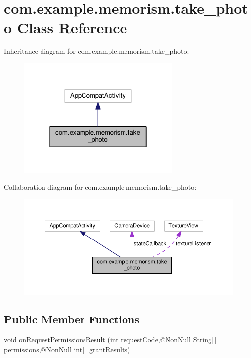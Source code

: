 \hypertarget{classcom_1_1example_1_1memorism_1_1take__photo}{}\section{com.\+example.\+memorism.\+take\+\_\+photo Class Reference}
\label{classcom_1_1example_1_1memorism_1_1take__photo}


Inheritance diagram for com.\+example.\+memorism.\+take\+\_\+photo\+:
\nopagebreak
\begin{figure}[H]
\begin{center}
\leavevmode
\includegraphics[width=226pt]{d9/d92/classcom_1_1example_1_1memorism_1_1take__photo__inherit__graph}
\end{center}
\end{figure}


Collaboration diagram for com.\+example.\+memorism.\+take\+\_\+photo\+:
\nopagebreak
\begin{figure}[H]
\begin{center}
\leavevmode
\includegraphics[width=350pt]{dd/d80/classcom_1_1example_1_1memorism_1_1take__photo__coll__graph}
\end{center}
\end{figure}
\subsection*{Public Member Functions}
\begin{DoxyCompactItemize}
\item 
void \hyperlink{classcom_1_1example_1_1memorism_1_1take__photo_a01baf490997362acf99a51951aa61d72}{on\+Request\+Permissions\+Result} (int request\+Code,@Non\+Null String\mbox{[}$\,$\mbox{]} permissions,@Non\+Null int\mbox{[}$\,$\mbox{]} grant\+Results)
\end{DoxyCompactItemize}

